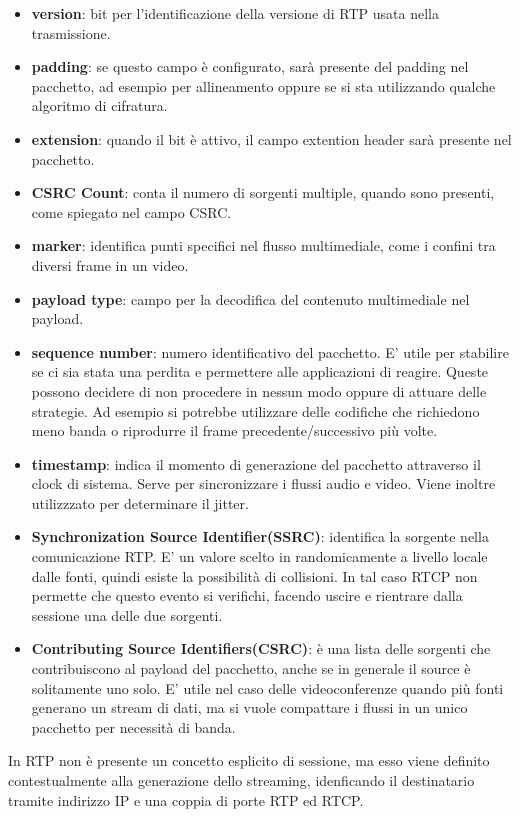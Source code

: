 \begin{itemize}
	\item \textbf{version}: bit per l'identificazione della versione di RTP usata nella trasmissione. 
	\item \textbf{padding}: se questo campo è configurato, sarà presente del padding nel pacchetto, ad esempio per allineamento oppure se si sta utilizzando qualche algoritmo di cifratura. 
	\item \textbf{extension}: quando il bit è attivo, il campo extention header sarà presente nel pacchetto. 
	\item \textbf{CSRC Count}: conta il numero di sorgenti multiple, quando sono presenti, come spiegato nel campo CSRC. 
	\item \textbf{marker}: identifica punti specifici nel flusso multimediale, come i confini tra diversi frame in un video.
	\item \textbf{payload type}: campo per la decodifica del contenuto multimediale nel payload.
	\item \textbf{sequence number}: numero identificativo del pacchetto. E' utile per stabilire se ci sia stata una perdita e permettere alle applicazioni di reagire. Queste possono decidere di non procedere in nessun modo oppure di attuare delle strategie. Ad esempio si potrebbe utilizzare delle codifiche che richiedono meno banda o riprodurre il frame precedente/successivo più volte.
	\item \textbf{timestamp}: indica il momento di generazione del pacchetto attraverso il clock di sistema. Serve per sincronizzare i flussi audio e video. Viene inoltre utilizzzato per determinare il jitter.
	\item \textbf{Synchronization Source Identifier(SSRC)}: identifica la sorgente nella comunicazione RTP. E' un valore scelto in randomicamente a livello locale dalle fonti, quindi esiste la possibilità di collisioni. In tal caso RTCP non permette che questo evento si verifichi, facendo uscire e rientrare dalla sessione una delle due sorgenti.
	\item \textbf{Contributing Source Identifiers(CSRC)}: è una lista delle sorgenti che contribuiscono al payload del pacchetto, anche se in generale il source è solitamente uno solo. E' utile nel caso delle videoconferenze quando più fonti generano un stream di dati, ma si vuole compattare i flussi in un unico pacchetto per necessità di banda. 
\end{itemize}

In RTP non è presente un concetto esplicito di sessione, ma esso viene definito contestualmente alla generazione dello streaming, idenficando il destinatario tramite indirizzo IP e una coppia di porte RTP ed RTCP. %

